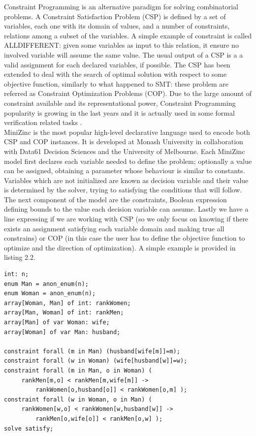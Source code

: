 Constraint Programming is an alternative paradigm for solving combinatorial problems. A Constraint Satisfaction Problem (CSP) is defined by a set of variables, each one with its domain of values, and a number of constraints, relations among a subset of the variables. A simple example of constraint is called ALLDIFFERENT: given some variables as input to this relation, it ensure no involved variable will assume the same value. The usual output of a CSP is a a valid assignment for each declared variables, if possible. The CSP has been extended to deal with the search of optimal solution with respect to some objective function, similarly to what happened to SMT: these problem are referred as Constraint Optimization Problems (COP).
Due to the large amount of constraint available and its representational power, Constraint Programming popularity is growing in the last years and it is actually used in some formal verification related tasks \cite{formcp}. \\
MiniZinc \cite{minizinc} is the most popular high-level declarative language used to encode both CSP and COP instances. It is developed at Monash University in collaboration with Data61 Decision Sciences and the University of Melbourne. Each MiniZinc model first declares each variable needed to define the problem; optionally a value can be assigned, obtaining a parameter whose behaviour is similar to constants. Variables which are not initialized are known as decision variable and their value is determined by the solver, trying to satisfying the conditions that will follow. The next component of the model are the constraints, Boolean expression defining bounds to the value each decision variable can assume. Lastly we have a line expressing if we are working with CSP (so we only focus on knowing if there exists an assignment satisfying each variable domain and making true all constrains) or COP (in this case the user has to define the objective function to optimize and the direction of optimization). A simple example is provided in listing 2.2.

\begin{lstlisting}[style=interfaces,caption=An example of MiniZinc encoding regarding the popular Stable Marriage Problem.]
int: n;
enum Man = anon_enum(n);
enum Woman = anon_enum(n);
array[Woman, Man] of int: rankWomen;
array[Man, Woman] of int: rankMen;
array[Man] of var Woman: wife;
array[Woman] of var Man: husband;

constraint forall (m in Man) (husband[wife[m]]=m);
constraint forall (w in Woman) (wife[husband[w]]=w);
constraint forall (m in Man, o in Woman) (
     rankMen[m,o] < rankMen[m,wife[m]] -> 
         rankWomen[o,husband[o]] < rankWomen[o,m] );
constraint forall (w in Woman, o in Man) (
     rankWomen[w,o] < rankWomen[w,husband[w]] -> 
         rankMen[o,wife[o]] < rankMen[o,w] );
solve satisfy;
\end{lstlisting}

